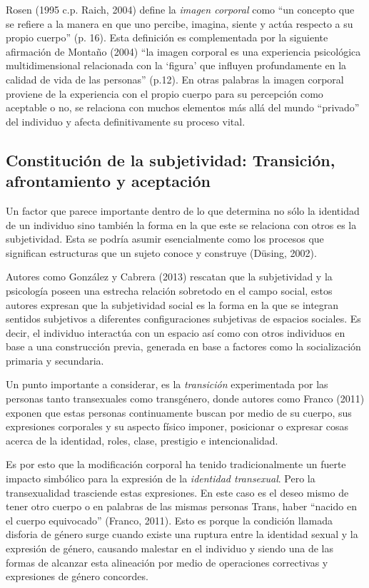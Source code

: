 Rosen (1995 c.p. Raich, 2004) define la \emph{imagen corporal} como “un concepto que
se refiere a la manera en que uno percibe, imagina, siente y actúa respecto a su
propio cuerpo” (p. 16).
Esta definición es complementada por la siguiente afirmación de Montaño (2004)
“la imagen corporal es una experiencia psicológica multidimensional relacionada
con la ‘figura’ que influyen profundamente en la calidad de vida de las
personas” (p.12).
En otras palabras la imagen corporal proviene de la experiencia con el propio
cuerpo para su percepción como aceptable o no, se relaciona con muchos elementos
más allá del mundo “privado” del individuo y afecta definitivamente su proceso
vital.

\subsection{Constitución de la subjetividad: Transición, afrontamiento y
aceptación}
Un factor que parece importante dentro de lo que determina no sólo la identidad
de un individuo sino también la forma en la que este se relaciona con otros es
la subjetividad.
Esta se podría asumir esencialmente como los procesos que significan
estructuras que un sujeto conoce y construye (Düsing, 2002).

Autores como González y Cabrera (2013) rescatan que la subjetividad y la
psicología poseen una estrecha relación sobretodo en el campo social, estos
autores expresan que la subjetividad social es la forma en la que se integran
sentidos subjetivos a diferentes configuraciones subjetivas de espacios
sociales.
Es decir, el individuo interactúa con un espacio así como con otros individuos
en base a una construcción previa, generada en base a factores como la
socialización primaria y secundaria.

Un punto importante a considerar, es la \emph{transición} experimentada por las
personas tanto transexuales como transgénero, donde autores como Franco (2011)
exponen que estas personas continuamente buscan por medio de su cuerpo, sus
expresiones corporales y su aspecto físico imponer, posicionar o expresar cosas
acerca de la identidad, roles, clase, prestigio e intencionalidad.

Es por esto que la modificación corporal ha tenido tradicionalmente un fuerte
impacto simbólico para la expresión de la \emph{identidad transexual}.
Pero la transexualidad trasciende estas expresiones.
En este caso es el deseo mismo de tener otro cuerpo o en palabras de las mismas
personas Trans, haber “nacido en el cuerpo equivocado” (Franco, 2011).
Esto es porque la condición llamada disforia de género surge cuando existe una
ruptura entre la identidad sexual y la expresión de género, causando malestar en
el individuo y siendo una de las formas de alcanzar esta alineación por medio de
operaciones correctivas y expresiones de género concordes.


